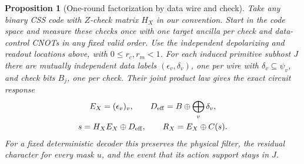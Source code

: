 \documentclass[10pt,twocolumn]{article}
\newtheorem{proposition}[theorem]{Proposition}
\theoremstyle{definition}
\begin{document}
\begin{proposition}[One-round factorization by data wire and check]
\label{prop:wire-check-fibres}
Take any binary CSS code with $Z$-check matrix $H_X$ in our convention.
Start in the code space and measure these checks once with one target
ancilla per check and data-control CNOTs in any fixed valid order.
Use the independent depolarizing and readout locations above, with
$0\le r_c,r_m<1$. For each induced primitive subhost $J$ there are
mutually independent data labels $(\epsilon_v,\delta_v)$, one per wire
with $\delta_v\subseteq\psi_v$, and check bits $B_j$, one per check.
Their joint product law gives the exact circuit response
\begin{equation}\label{eq:fibre-response}
\begin{gathered}
 E_X=(\epsilon_v)_v,\qquad D_{\rm eff}=B\oplus\bigoplus_v\delta_v,\\
 s=H_XE_X\oplus D_{\rm eff},\qquad R_X=E_X\oplus C(s).
\end{gathered}
\end{equation}
For a fixed deterministic decoder this preserves the physical filter,
the residual character for every mask $u$, and the event that its
action support stays in $J$.
\end{proposition}
\end{document}
